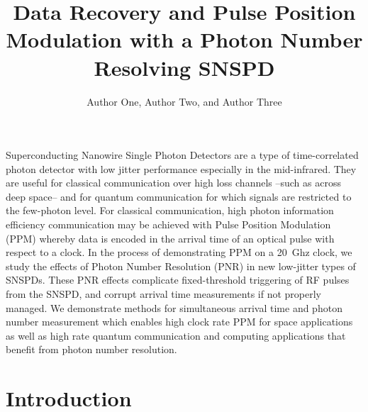 \documentclass{optica-article}
\begin{document}
\title{Data Recovery and Pulse Position Modulation with a Photon Number Resolving SNSPD}

\author{Author One, Author Two, and Author Three}

\address{Peer Review, Publications Department, Optica Publishing Group, 2010 Massachusetts Avenue NW, Washington, DC 20036, USA\\
Publications Department, Optica Publishing Group, 2010 Massachusetts Avenue NW, Washington, DC 20036, USA\\
Currently with the Department of Electronic Journals, Optica Publishing Group, 2010 Massachusetts Avenue NW, Washington, DC 20036, USA}



\begin{abstract*} 
Superconducting Nanowire Single Photon Detectors are a type of time-correlated photon detector with low jitter performance especially in the mid-infrared. They are useful for classical communication over high loss channels --such as across deep space-- and for quantum communication for which signals are restricted to the few-photon level. For classical communication, high photon information efficiency communication may be achieved with Pulse Position Modulation (PPM) whereby data is encoded in the arrival time of an optical pulse with respect to a clock. In the process of demonstrating PPM on a 20~Ghz clock, we study the effects of Photon Number Resolution (PNR) in new low-jitter types of SNSPDs. These PNR effects complicate fixed-threshold triggering of RF pulses from the SNSPD, and corrupt arrival time measurements if not properly managed. We demonstrate methods for simultaneous arrival time and photon number measurement which enables high clock rate PPM for space applications as well as high rate quantum communication and computing applications that benefit from photon number resolution.
\end{abstract*}

\hypertarget{introduction}{%
\section{Introduction}\label{introduction}}
\end{document}

